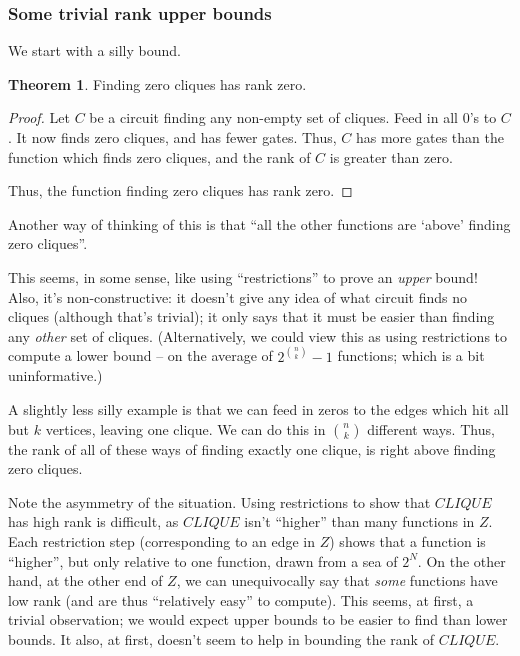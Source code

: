 \documentclass[12pt]{article}
\theoremstyle{definition}
\newtheorem{thm}{Theorem}[section]
\begin{document}
\subsubsection{Some trivial rank upper bounds}

We start with a silly bound.

\begin{thm}
\label{zeroCliques}
Finding zero cliques has rank zero.
\end{thm}
\begin{proof}

Let $C$ be a circuit finding any non-empty set of cliques.
Feed in all 0's to $C$. It now finds zero cliques, and has
fewer gates. Thus, $C$ has more gates than the function
which finds zero cliques, and the rank of $C$ is greater
than zero.

Thus, the function finding zero cliques has rank zero.

\end{proof}
 
Another way of thinking of this is that ``all the other functions
are `above' finding zero cliques''.

This seems, in some sense, like using ``restrictions'' to prove an {\em upper} bound!
Also, it's non-constructive: it doesn't give any idea of what circuit finds no cliques
(although that's trivial); it only says that it must be easier than finding any
{\em other} set of cliques. (Alternatively, we could view this as using restrictions
to compute a lower bound -- on the average of $2^{n \choose k} - 1$ functions; which
is a bit uninformative.)

A slightly less silly example is that we can feed in zeros to 
the edges which hit all but $k$ vertices, leaving one clique.
We can do this in ${n \choose k}$ different ways. Thus, the rank
of all of these ways of finding exactly one clique, is right above
finding zero cliques.

Note the asymmetry of the situation. Using restrictions to show that
$CLIQUE$ has high rank is difficult, as $CLIQUE$ isn't ``higher'' than
many functions in $Z$. Each restriction step (corresponding to an edge in $Z$)
shows that a function is
``higher'', but only relative to one function, drawn from a sea of $2^N$.
On the other hand, at the other end of $Z$, we can unequivocally say
that {\em some} functions have low rank (and are thus
``relatively easy'' to compute).
This seems, at first, a trivial observation; we would expect upper bounds
to be easier to find than lower bounds. It also, at first, doesn't seem
to help in bounding the rank of $CLIQUE$.
\end{document}
